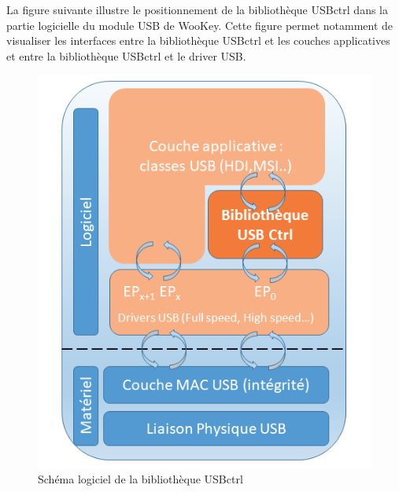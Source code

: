 \noindent La figure suivante illustre le positionnement de la bibliothèque USBctrl dans la partie logicielle du module USB de WooKey. Cette figure permet notamment de visualiser les interfaces entre la bibliothèque USBctrl et les couches applicatives et entre la bibliothèque USBctrl et le driver USB.

\begin{figure}[!h]
\centering
\includegraphics[width=16cm]{images/schema_usbctrl.png}
\caption{Schéma logiciel de la bibliothèque USBctrl}
\label{Schéma logiciel de la bibliothèque USBctrl}
\end{figure}


